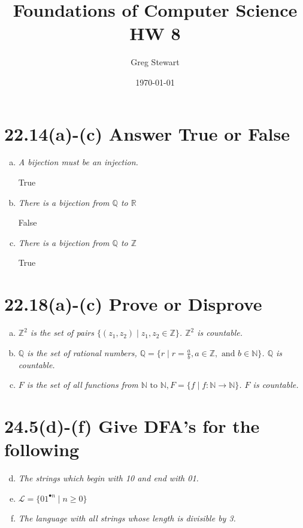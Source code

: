 \documentclass{article}
\title{Foundations of Computer Science HW 8}
\author{Greg Stewart}
\date{\today}
\begin{document}
\maketitle

\section*{22.14(a)-(c)  \normalsize Answer True or False}

\begin{enumerate}[(a)]
  \item \textit{A bijection must be an injection.}

    True
  \item \textit{There is a bijection from $\mathbb{Q}$ to $\mathbb{R}$}

    False
  \item \textit{There is a bijection from $\mathbb{Q}$ to $\mathbb{Z}$}

    True
\end{enumerate}





\section*{22.18(a)-(c)  \normalsize Prove or Disprove}

\begin{enumerate}[(a)]
  \item \textit{$\mathbb{Z}^2$ is the set of pairs $\{(z_1, z_2) \mid z_1,z_2 \in \mathbb{Z}\}$. $\mathbb{Z}^2$ is countable.}
  \item \textit{$\mathbb{Q}$ is the set of rational numbers, $\mathbb{Q} = \{r \mid r=\frac{a}{b}, a\in \mathbb{Z}, \text{ and } b \in \mathbb{N}\}$. $\mathbb{Q}$ is countable.}
  \item \textit{$F$ is the set of all functions from $\mathbb{N} \text{ to } \mathbb{N}, F = \{f \mid f : \mathbb{N} \rightarrow \mathbb{N}\}$. $F$ is countable.}
\end{enumerate}





\section*{24.5(d)-(f)  \normalsize Give DFA's for the following}

\begin{enumerate}[(a)]\setcounter{enumi}{3}
  \item \textit{The strings which begin with 10 and end with 01.}
  \item \textit{$\mathscr{L} = \{01^{\bullet n} \mid n \geq 0\}$}
  \item \textit{The language with all strings whose length is divisible by 3.}
\end{enumerate}
\end{document}
